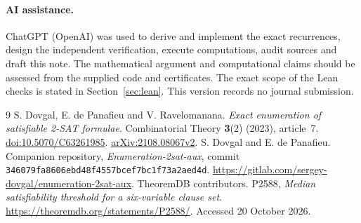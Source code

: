 \documentclass[11pt,a4paper]{article}
\begin{document}
\paragraph{AI assistance.}
ChatGPT (OpenAI) was used to derive and implement the exact recurrences, design the
independent verification, execute computations, audit sources and draft this
note. The mathematical argument and computational claims should be assessed
from the supplied code and certificates. The exact scope of the Lean checks
is stated in Section~\ref{sec:lean}. This version records no journal submission.

\begin{thebibliography}{9}
 S. Dovgal, E. de Panafieu and V. Ravelomanana.
\emph{Exact enumeration of satisfiable 2-SAT formulae}.
Combinatorial Theory \textbf{3}(2) (2023), article~7.
\href{https://doi.org/10.5070/C63261985}{doi:10.5070/C63261985}.
\href{https://arxiv.org/abs/2108.08067v2}{arXiv:2108.08067v2}.
 S. Dovgal and E. de Panafieu. Companion repository,
\emph{Enumeration-2sat-aux}, commit
\texttt{346079fa8606ebd48f4557bcef7bc1f73a2aed4d}.
\url{https://gitlab.com/sergey-dovgal/enumeration-2sat-aux}.
 TheoremDB contributors. P2588,
\emph{Median satisfiability threshold for a six-variable clause set}.
\url{https://theoremdb.org/statements/P2588/}. Accessed 20 October 2026.
\end{thebibliography}
\end{document}
